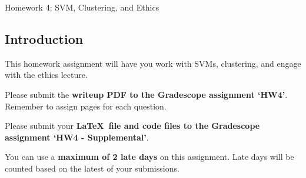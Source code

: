 \documentclass[submit]{harvardml}
\begin{document}
\begin{center}
{\Large Homework 4: SVM, Clustering, and Ethics}\\
\end{center}

\subsection*{Introduction}

This homework assignment will have you work with SVMs, 
clustering, and engage with the ethics lecture.  

Please submit the \textbf{writeup PDF to the Gradescope assignment `HW4'}. Remember to assign pages for each question.

Please submit your \textbf{\LaTeX\ file and code files to the Gradescope assignment `HW4 - Supplemental'}. 

You can use a \textbf{maximum of 2 late days} on this assignment.  Late days will be counted based on the latest of your submissions. 

\newpage
\end{document}
